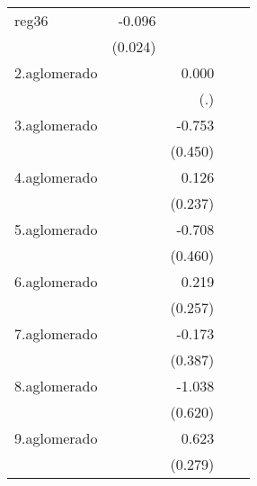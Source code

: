 {\begin{longtable}{l*{4}{D{.}{.}{-1}}}
\addlinespace
reg36       &      -0.096\sym{***}&                     &                     &                     \\
            &     (0.024)         &                     &                     &                     \\
\addlinespace
2.aglomerado&                     &       0.000         &                     &                     \\
            &                     &         (.)         &                     &                     \\
\addlinespace
3.aglomerado&                     &      -0.753         &                     &                     \\
            &                     &     (0.450)         &                     &                     \\
\addlinespace
4.aglomerado&                     &       0.126         &                     &                     \\
            &                     &     (0.237)         &                     &                     \\
\addlinespace
5.aglomerado&                     &      -0.708         &                     &                     \\
            &                     &     (0.460)         &                     &                     \\
\addlinespace
6.aglomerado&                     &       0.219         &                     &                     \\
            &                     &     (0.257)         &                     &                     \\
\addlinespace
7.aglomerado&                     &      -0.173         &                     &                     \\
            &                     &     (0.387)         &                     &                     \\
\addlinespace
8.aglomerado&                     &      -1.038         &                     &                     \\
            &                     &     (0.620)         &                     &                     \\
\addlinespace
9.aglomerado&                     &       0.623\sym{*}  &                     &                     \\
            &                     &     (0.279)         &                     &                     \\

\end{longtable}}
